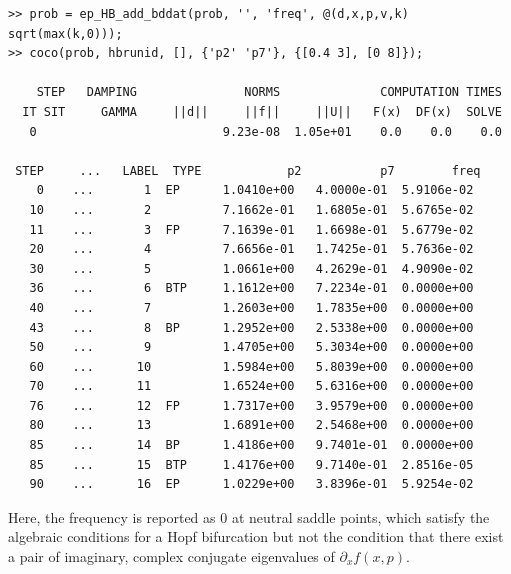 \begin{lstlisting}[language=coco-highlight,frame=lines]
>> prob = ep_HB_add_bddat(prob, '', 'freq', @(d,x,p,v,k) sqrt(max(k,0)));
>> coco(prob, hbrunid, [], {'p2' 'p7'}, {[0.4 3], [0 8]});

    STEP   DAMPING               NORMS              COMPUTATION TIMES
  IT SIT     GAMMA     ||d||     ||f||     ||U||   F(x)  DF(x)  SOLVE
   0                          9.23e-08  1.05e+01    0.0    0.0    0.0

 STEP     ...   LABEL  TYPE            p2           p7        freq
    0    ...       1  EP      1.0410e+00   4.0000e-01  5.9106e-02
   10    ...       2          7.1662e-01   1.6805e-01  5.6765e-02
   11    ...       3  FP      7.1639e-01   1.6698e-01  5.6779e-02
   20    ...       4          7.6656e-01   1.7425e-01  5.7636e-02
   30    ...       5          1.0661e+00   4.2629e-01  4.9090e-02
   36    ...       6  BTP     1.1612e+00   7.2234e-01  0.0000e+00
   40    ...       7          1.2603e+00   1.7835e+00  0.0000e+00
   43    ...       8  BP      1.2952e+00   2.5338e+00  0.0000e+00
   50    ...       9          1.4705e+00   5.3034e+00  0.0000e+00
   60    ...      10          1.5984e+00   5.8039e+00  0.0000e+00
   70    ...      11          1.6524e+00   5.6316e+00  0.0000e+00
   76    ...      12  FP      1.7317e+00   3.9579e+00  0.0000e+00
   80    ...      13          1.6891e+00   2.5468e+00  0.0000e+00
   85    ...      14  BP      1.4186e+00   9.7401e-01  0.0000e+00
   85    ...      15  BTP     1.4176e+00   9.7140e-01  2.8516e-05
   90    ...      16  EP      1.0229e+00   3.8396e-01  5.9254e-02
\end{lstlisting}
Here, the frequency is reported as $0$ at neutral saddle points, which satisfy the algebraic conditions for a Hopf bifurcation but not the condition that there exist a pair of imaginary, complex conjugate eigenvalues of $\partial_xf(x,p)$.

